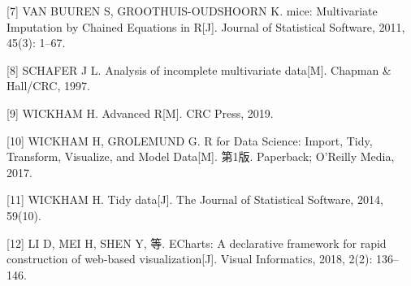 \documentclass[]{ctexart}
\begin{document}
\leavevmode\hypertarget{ref-citation_mice}{}%
{[}7{]} VAN BUUREN S, GROOTHUIS-OUDSHOORN K. mice: Multivariate
Imputation by Chained Equations in R{[}J{]}. Journal of Statistical
Software, 2011, 45(3): 1--67.

\leavevmode\hypertarget{ref-schafer_1997}{}%
{[}8{]} SCHAFER J L. Analysis of incomplete multivariate data{[}M{]}.
Chapman \& Hall/CRC, 1997.

\leavevmode\hypertarget{ref-wickham_2019}{}%
{[}9{]} WICKHAM H. Advanced R{[}M{]}. CRC Press, 2019.

\leavevmode\hypertarget{ref-Wickham2017R}{}%
{[}10{]} WICKHAM H, GROLEMUND G. R for Data Science: Import, Tidy,
Transform, Visualize, and Model Data{[}M{]}. 第1版. Paperback; O'Reilly
Media, 2017.

\leavevmode\hypertarget{ref-tidy-data}{}%
{[}11{]} WICKHAM H. Tidy data{[}J{]}. The Journal of Statistical
Software, 2014, 59(10).

\leavevmode\hypertarget{ref-LI2018136}{}%
{[}12{]} LI D, MEI H, SHEN Y, 等. ECharts: A declarative framework for
rapid construction of web-based visualization{[}J{]}. Visual
Informatics, 2018, 2(2): 136--146.
\end{document}
